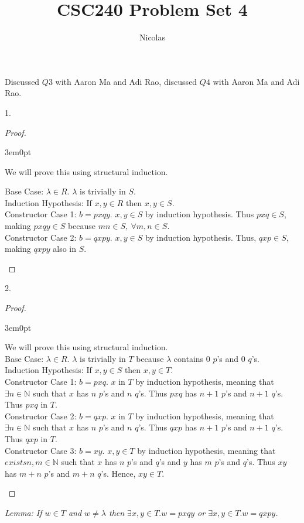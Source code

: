 \documentclass[11pt]{article}
\title{CSC240 Problem Set 4}
\author{Nicolas}
\newcommand{\N}{\mathbb{N}}
\newcommand{\nskip}{\\ \bigskip}
\newenvironment{myproof}
{\begin{proof} \begin{adjustwidth}{3em}{0pt}$ $\par\nobreak\ignorespaces}
{\end{adjustwidth} \end{proof}}
\begin{document}
\maketitle
\begin{flushleft}

Discussed $Q3$ with Aaron Ma and Adi Rao, discussed $Q4$ with Aaron Ma and Adi Rao.

1.

\begin{myproof}
We will prove this using structural induction. \nskip

Base Case: $\lambda \in R$. $\lambda$ is trivially in $S$. \nskip
Induction Hypothesis: If $x, y \in R$ then $x,y \in S$. \nskip
Constructor Case 1: $b = pxqy$. $x,y \in S$ by induction hypothesis. Thus $pxq \in S$, making $pxqy \in S$ because $mn \in S, \ \forall m,n \in S$. \nskip
Constructor Case 2: $b = qxpy$. $x,y \in S$ by induction hypothesis. Thus, $qxp \in S$, making $qxpy$ also in $S$.
\end{myproof}


2.

\begin{myproof}
We will prove this using structural induction. \nskip
Base Case: $\lambda \in R$. $\lambda$ is trivially in $T$ because $\lambda$ contains 0 $p$'s and 0 $q$'s. \nskip
Induction Hypothesis: If $x, y \in S$ then $x,y \in T$. \nskip
Constructor Case 1: $b = pxq$. $x$ in $T$ by induction hypothesis, meaning that $\exists n \in \N$ such that $x$ has $n$ $p$'s and $n$ $q$'s. Thus $pxq$ has $n+1$ $p$'s and $n+1$ $q$'s. Thus $pxq$ in $T$. \nskip
Constructor Case 2: $b = qxp$. $x$ in $T$ by induction hypothesis,  meaning that $\exists n \in \N$ such that $x$ has $n$ $p$'s and $n$ $q$'s. Thus $qxp$ has $n+1$ $p$'s and $n+1$ $q$'s. Thus $qxp$ in $T$. \nskip
Constructor Case 3: $b = xy$. $x,y \in T$ by induction hypothesis, meaning that $exists n,m \in \N$ such that $x$ has $n$ $p$'s and $q$'s and $y$ has $m$ $p$'s and $q$'s. Thus $xy$ has $m+n$ $p$'s and $m+n$ $q$'s. Hence, $xy \in T$.
\end{myproof} 


\textit{Lemma: If $w \in T$ and $w \neq \lambda$ then $\exists x,y \in T. w = pxqy$ or $\exists x,y \in T. w = qxpy$.}


\end{flushleft}
\end{document}

